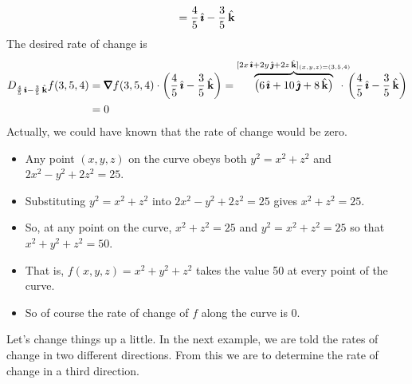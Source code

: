 \begin{eg}
\begin{equation*}
=\frac{4}{5}\,\hat{\pmb{\imath}} -\frac{3}{5}\,\hat{\mathbf{k}}
\end{equation*}
The desired rate of change is
\begin{align*}
D_{\frac{4}{5}\,\hi -\frac{3}{5}\,\hk} f(3,5,4) 
   &= \vnabla f(3,5,4)\cdot\left(\frac{4}{5}\,\hi -\frac{3}{5}\,\hk\right)
   = \overbrace{\big( 6\,\hi +10\, \hj + 8\,\hk\big)}^
              {[2x\,\hi+2y\,\hj+2z\,\hk]_{(x,y,z)=(3,5,4)}}\hskip-0.15in\cdot\,  
         \left(\frac{4}{5}\,\hi -\frac{3}{5}\,\hk\right) \\
  &=0
\end{align*}
Actually, we could have known that the rate of change would be zero.
\begin{itemize}\itemindent=-0.1in
\item
Any point $(x,y,z)$ on the curve obeys both $y^2=x^2+z^2$ 
      and $2x^2-y^2+2z^2=25$. 
\item
Substituting $y^2=x^2+z^2$ into $2x^2-y^2+2z^2=25$ gives $x^2+z^2=25$. 
\item
So, at any point on the curve, $x^2+z^2=25$ and $y^2=x^2+z^2=25$ so 
that $x^2+y^2+z^2=50$. 
\item
That is, $f(x,y,z)=x^2+y^2+z^2$ takes the value 50 at every point of the curve.
\item
So of course the rate of change of $f$ along the curve is $0$.
\end{itemize}
\end{eg}

Let's change things up a little. In the next example, we are told the rates of change in two different directions. From this we are to determine the rate of change in a third direction.


